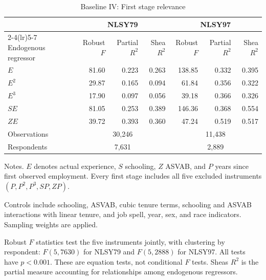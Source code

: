 \begin{table}[p]\centering
\caption{Baseline IV: First stage relevance}\label{tab:baseline_iv_firststage}
\begin{threeparttable}\small
\begin{tabular*}{\textwidth}{@{\extracolsep{\fill}}lrrrrrr@{}}
\toprule
& \multicolumn{3}{c}{NLSY79} & \multicolumn{3}{c}{NLSY97} \\
\cmidrule(lr){2-4}\cmidrule(lr){5-7}
Endogenous regressor & Robust $F$ & Partial $R^2$ & Shea $R^2$ & Robust $F$ & Partial $R^2$ & Shea $R^2$ \\
\midrule
$E$ & 81.60 & 0.223 & 0.263 & 138.85 & 0.332 & 0.395 \\
$E^2$ & 29.87 & 0.165 & 0.094 & 61.84 & 0.356 & 0.322 \\
$E^3$ & 17.90 & 0.097 & 0.056 & 39.18 & 0.366 & 0.326 \\
$S E$ & 81.05 & 0.253 & 0.389 & 146.36 & 0.368 & 0.554 \\
$Z E$ & 39.72 & 0.393 & 0.360 & 47.24 & 0.519 & 0.517 \\
\midrule
Observations & \multicolumn{3}{c}{30,246} & \multicolumn{3}{c}{11,438} \\
Respondents & \multicolumn{3}{c}{7,631} & \multicolumn{3}{c}{2,889} \\
\bottomrule\end{tabular*}
\begin{tablenotes}[flushleft]\footnotesize
\item Notes. $E$ denotes actual experience, $S$ schooling, $Z$ ASVAB, and $P$ years since first observed employment. Every first stage includes all five excluded instruments $(P,P^2,P^3,SP,ZP)$.
\item Controls include schooling, ASVAB, cubic tenure terms, schooling and ASVAB interactions with linear tenure, and job spell, year, sex, and race indicators. Sampling weights are applied.
\item Robust $F$ statistics test the five instruments jointly, with clustering by respondent: $F(5,7630)$ for NLSY79 and $F(5,2888)$ for NLSY97. All tests have $p<0.001$. These are equation tests, not conditional $F$ tests. Shea\textquotesingle s $R^2$ is the partial measure accounting for relationships among endogenous regressors.
\end{tablenotes}\end{threeparttable}\end{table}
